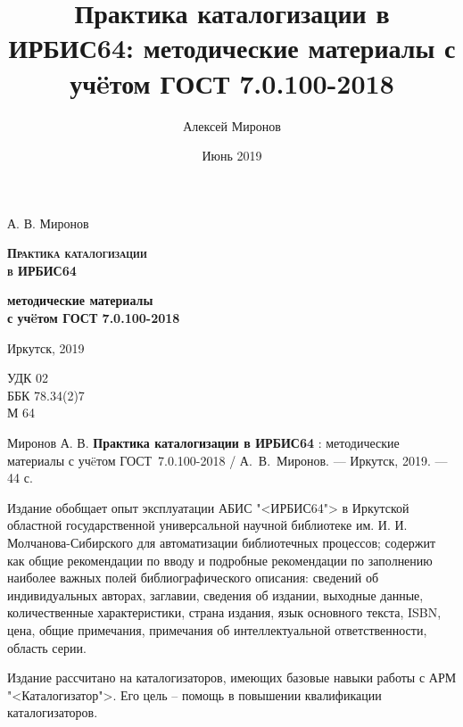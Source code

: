 \documentclass[a5paper,openany,10pt]{book}
\begin{document}
\frontmatter
\author{Алексей Миронов}
\title{Практика каталогизации в ИРБИС64: методические материалы с уч\"eтом ГОСТ 7.0.100-2018}
\date{Июнь 2019}

\begin{titlepage}
\clearpage\vspace*{\fill}
\begin{center}
	{\Large А. В. Миронов}
	
	\vspace{55mm}
	
	{\sffamily
		{\Huge\textbf{\textsc{Практика каталогизации\\в ИРБИС64}}}
	
		\vspace{5mm}
	
		{\large \textbf{методические материалы \\с уч\"eтом ГОСТ 7.0.100-2018}}
    }

	\vspace{65mm}
	
	{\large Иркутск, 2019}
\end{center}
\vspace*{\fill}
\end{titlepage}

\clearpage
\thispagestyle{empty}
\noindent УДК 02 \\
ББК 78.34(2)7 \\
М 64

\vspace{8mm}

Миронов А. В. \textbf{Практика каталогизации в ИРБИС64} : методические материалы с уч\"eтом ГОСТ~7.0.100-2018 / А.~В.~Миронов. — Иркутск, 2019. — 44 с.


\vspace{8mm}

Издание обобщает опыт эксплуатации АБИС "<ИРБИС64"> в Иркутской областной государственной универсальной научной библиотеке им. И. И. Мол\-ча\-но\-ва-Сибирского для автоматизации библиотечных процессов; содержит как общие рекомендации по вводу и подробные рекомендации по заполнению наиболее важных полей библиографического описания: сведений об индивидуальных авторах, заглавии, сведения об издании, выходные данные, количественные характеристики, страна издания, язык основного текста, ISBN, цена, общие примечания, примечания об интеллектуальной ответственности, область серии.

\vspace{3mm}
Издание рассчитано на каталогизаторов, имеющих базовые навыки работы с АРМ "<Каталогизатор">. Его цель – помощь в повышении квалификации каталогизаторов.
\end{document}
